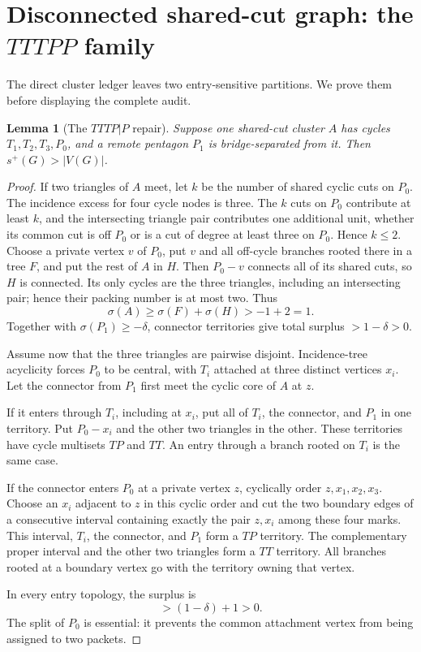 \documentclass[11pt]{article}
\newtheorem{lemma}[theorem]{Lemma}
\newcommand{\spE}{s^+}
\newcommand{\sig}{\sigma}
\begin{document}
\section{Disconnected shared-cut graph: the $TTTPP$ family}

The direct cluster ledger leaves two entry-sensitive partitions.  We prove
them before displaying the complete audit.

\begin{lemma}[The $TTTP|P$ repair]\label{lem:tttp-p}
Suppose one shared-cut cluster $A$ has cycles $T_1,T_2,T_3,P_0$, and a remote
pentagon $P_1$ is bridge-separated from it.  Then $\spE(G)>|V(G)|$.
\end{lemma}

\begin{proof}
If two triangles of $A$ meet, let $k$ be the number of shared cyclic cuts on
$P_0$.  The incidence excess for four cycle nodes is three.  The $k$ cuts on
$P_0$ contribute at least $k$, and the intersecting triangle pair contributes
one additional unit, whether its common cut is off $P_0$ or is a cut of degree
at least three on $P_0$.  Hence $k\leq2$.  Choose a private vertex $v$ of
$P_0$, put $v$ and all off-cycle branches rooted there in a tree $F$, and put
the rest of $A$ in $H$.  Then $P_0-v$ connects all of its shared cuts, so $H$
is connected.  Its only cycles are the three triangles, including an
intersecting pair; hence their packing number is at most two.  Thus
\[
 \sig(A)\geq\sig(F)+\sig(H)>-1+2=1.
\]
Together with $\sig(P_1)\geq-\delta$, connector territories give total
surplus $>1-\delta>0$.

Assume now that the three triangles are pairwise disjoint.  Incidence-tree
acyclicity forces $P_0$ to be central, with $T_i$ attached at three distinct
vertices $x_i$.  Let the connector from $P_1$ first meet the cyclic core of
$A$ at $z$.

If it enters through $T_i$, including at $x_i$, put all of $T_i$, the
connector, and $P_1$ in one territory.  Put $P_0-x_i$ and the other two
triangles in the other.  These territories have cycle multisets $TP$ and
$TT$.  An entry through a branch rooted on $T_i$ is the same case.

If the connector enters $P_0$ at a private vertex $z$, cyclically order
$z,x_1,x_2,x_3$.  Choose an $x_i$ adjacent to $z$ in this cyclic order and
cut the two boundary edges of a consecutive interval containing exactly the
pair $z,x_i$ among these four marks.  This interval, $T_i$, the connector,
and $P_1$ form a $TP$ territory.  The complementary proper interval and the
other two triangles form a $TT$ territory.  All branches rooted at a boundary
vertex go with the territory owning that vertex.

In every entry topology, the surplus is
\[
 >(1-\delta)+1>0.
\]
The split of $P_0$ is essential: it prevents the common attachment vertex from
being assigned to two packets.
\end{proof}
\end{document}
